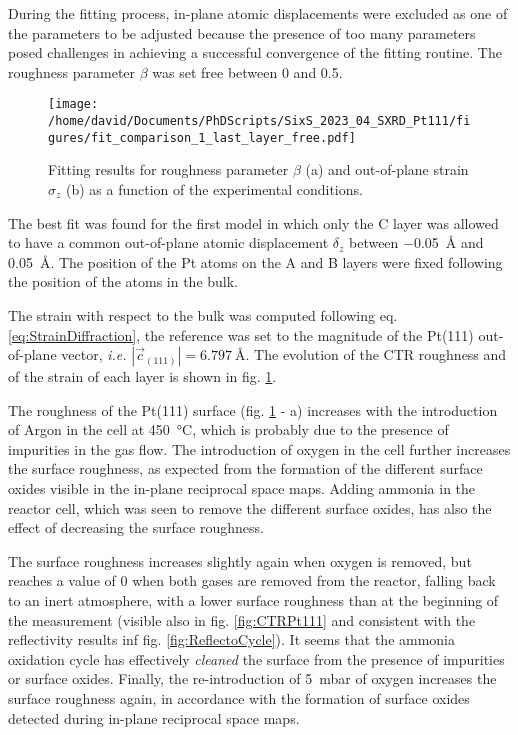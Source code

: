 During the fitting process, in-plane atomic displacements were excluded as one of the parameters to be adjusted because the presence of too many parameters posed challenges in achieving a successful convergence of the fitting routine.
The roughness parameter $\beta$ was set free between 0 and 0.5.%

\begin{figure}[!htb]
    \centering
    \texttt{[image: /home/david/Documents/PhDScripts/SixS\_2023\_04\_SXRD\_Pt111/figures/fit\_comparison\_1\_last\_layer\_free.pdf]}
    \caption{
        Fitting results for roughness parameter $\beta$ (a) and out-of-plane strain $\sigma_z$ (b) as a function of the experimental conditions.
    }
    \label{fig:CTRFit111}
\end{figure}

The best fit was found for the first model in which only the C layer was allowed to have a common out-of-plane atomic displacement $\delta_z$ between \qty{-0.05}{\angstrom} and \qty{0.05}{\angstrom}.
The position of the Pt atoms on the A and B layers were fixed following the position of the atoms in the bulk.

The strain with respect to the bulk was computed following eq. \ref{eq:StrainDiffraction}, the reference was set to the magnitude of the Pt(111) out-of-plane vector, \textit{i.e.} $|\vec{c}_{(111)}| = \qty{6.797}{\angstrom}$.
The evolution of the CTR roughness and of the strain of each layer is shown in fig. \ref{fig:CTRFit111}.

The roughness of the Pt(111) surface (fig. \ref{fig:CTRFit111} - a) increases with the introduction of Argon in the cell at \qty{450}{\degreeCelsius}, which is probably due to the presence of impurities in the gas flow.
The introduction of oxygen in the cell further increases the surface roughness, as expected from the formation of the different surface oxides visible in the in-plane reciprocal space maps.
Adding ammonia in the reactor cell, which was seen to remove the different surface oxides, has also the effect of decreasing the surface roughness.

The surface roughness increases slightly again when oxygen is removed, but reaches a value of 0 when both gases are removed from the reactor, falling back to an inert atmosphere, with a lower surface roughness than at the beginning of the measurement (visible also in fig. \ref{fig:CTRPt111} and consistent with the reflectivity results inf fig. \ref{fig:ReflectoCycle}).
It seems that the ammonia oxidation cycle has effectively \textit{cleaned} the surface from the presence of impurities or surface oxides.
Finally, the re-introduction of \qty{5}{\milli\bar} of oxygen increases the surface roughness again, in accordance with the formation of surface oxides detected during in-plane reciprocal space maps.

